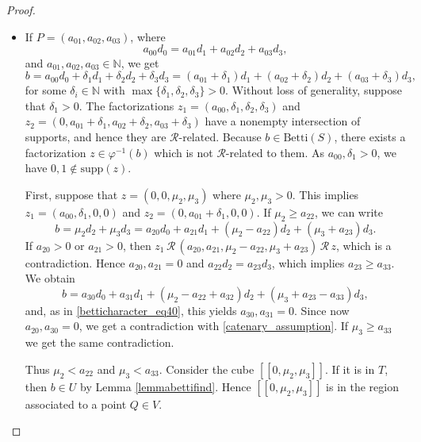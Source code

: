 \documentclass[12pt]{article}
\theoremstyle{remark}
\begin{document}
\begin{proof}
\begin{itemize}
    \item If $P =(a_{01},a_{02},a_{03})$, where
    \begin{equation}\label{betticharacter_eq2}
        a_{00}d_0  =  a_{01}d_1 + a_{02}d_2 + a_{03}d_3,
    \end{equation}
     and $a_{01},a_{02},a_{03} \in \mathbb{N}$, we get
     \begin{equation}\label{betticharacter_eq3}
        b =a_{00}d_0 + \delta_1d_1 + \delta_2d_2 + \delta_3d_3  =  (a_{01}+\delta_1)d_1 + (a_{02}+\delta_2)d_2 + (a_{03}+\delta_3)d_3,
    \end{equation}
    for some $\delta_i \in \mathbb{N}$ with $\max \{\delta_1,\delta_2,\delta_3\} > 0$. Without loss of generality, suppose that $\delta_1 > 0$. The factorizations $z_1 =(a_{00},\delta_1,\delta_2,\delta_3)$ and $z_2 =(0,a_{01}+\delta_1,a_{02}+\delta_2,a_{03}+\delta_3)$ have a nonempty intersection of supports, and hence they are $\mathcal{R}$-related. Because $b \in \text{Betti}(S)$, there exists a factorization $z \in \varphi^{-1}(b)$ which is not $\mathcal{R}$-related to them. As $a_{00},\delta_1 >0$, we have $0,1 \notin \text{supp}(z)$. 

     First, suppose that $z = (0,0,\mu_2,\mu_3)$ where $\mu_2,\mu_3>0$. This implies $z_1 = (a_{00},\delta_1,0,0 )$ and $z_2 =(0,a_{01}+\delta_1,0,0)$. 
    If $\mu_2 \geq a_{22}$, we can write
   \begin{equation}\label{betticharacter_eq40}
         b =\mu_2d_2 + \mu_3d_3 = a_{20}d_0 + a_{21}d_1 +(\mu_2-a_{22})d_2 + (\mu_3+a_{23})d_3.
   \end{equation}
   If $a_{20}>0$ or $a_{21}>0$, then $z_1 \, \mathcal{R} \,(a_{20},a_{21},\mu_2-a_{22},\mu_3+a_{23}) \, \mathcal{R} \, z$, which is a contradiction. Hence $a_{20},a_{21}=0$ and $a_{22}d_2 = a_{23}d_3$, which implies $a_{23} \geq a_{33}$. We obtain
   \begin{equation}\label{betticharacter_eq401}
        b=  a_{30}d_0 + a_{31}d_1 + (\mu_2-a_{22} + a_{32})d_2 + (\mu_3+a_{23}-a_{33})d_3,
   \end{equation}
   and, as in \eqref{betticharacter_eq40}, this yields $a_{30},a_{31}=0$. Since now $a_{20},a_{30} =0$, we get a contradiction with \eqref{catenary_assumption}.
   If $\mu_3 \geq a_{33}$ we get the same contradiction. 
   
   Thus $\mu_2 < a_{22}$ and $ \mu_3 < a_{33}$. 
   Consider the cube $[[0,\mu_2,\mu_3]]$. If it is in $T$, then $b \in U$ by Lemma \ref{lemmabettifind}. Hence $[[0,\mu_2,\mu_3]]$ is in the region associated to a point $Q \in V$.
   

\end{itemize}
\end{proof}
\end{document}
